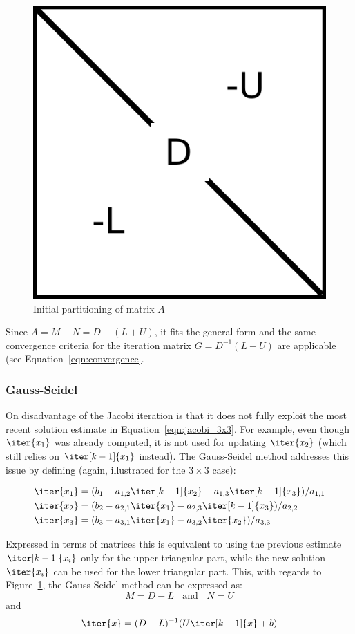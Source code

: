 \begin{figure}[h]
    \centering
    \includegraphics[width=0.4\linewidth]{chapters/2_solvers/2_3_iterative_solvers/figures/Splitting.pdf}
    \caption{Initial partitioning of matrix $A$}
    \label{fig:splitting}
\end{figure}

\noindent Since $A = M -N = D - (L +U)$, it fits the general form and the same convergence criteria for the iteration matrix $G=D^{-1}(L+U)$ are applicable (see Equation~\hyperref[eqn:convergence]{\ref{eqn:convergence}}.

\subsubsection{Gauss-Seidel}
On disadvantage of the Jacobi iteration is that it does not fully exploit the most recent solution estimate in Equation~\hyperref[eqn:jacobi_3x3]{\ref{eqn:jacobi_3x3}}. For example, even though $\iter{x_1}$ was already computed, it is not used for updating $\iter{x_2}$ (which still relies on $\iter[k-1]{x_1}$ instead). The Gauss-Seidel method addresses this issue by defining (again, illustrated for the $3 \times 3$ case):

\begin{equation}
\label{eqn:gauss_seidel}
   \begin{aligned}
    \iter{x_1} & =  (b_1 -a_{1,2}\iter[k-1]{x_2} - a_{1,3}\iter[k-1]{x_3})/a_{1,1} \\
    \iter{x_2} & =  (b_2 -a_{2,1}\iter{x_1} - a_{2,3}\iter[k-1]{x_3})/a_{2,2} \\
    \iter{x_3} & =  (b_3 -a_{3,1}\iter{x_1} - a_{3,2}\iter{x_2})/a_{3,3} \\
\end{aligned} 
\end{equation}

\noindent Expressed in terms of matrices this is equivalent to using the previous estimate $\iter[k-1]{x_i}$ only for the upper triangular part, while the new solution $\iter{x_i}$ can be used for the lower triangular part. This, with regards to Figure~\hyperref[fig:splitting]{\ref{fig:splitting}}, the Gauss-Seidel method can be expressed as:
\begin{equation}
    M=D-L \;\;\text{ and } \;\; N=U
\end{equation}
\noindent and
\begin{equation}
    \iter{x} = (D-L)^{-1}(U\iter[k-1]{x} +b)
\end{equation}

